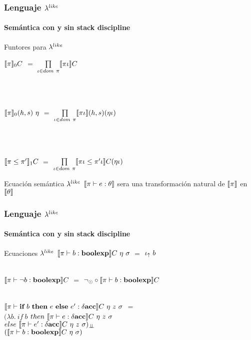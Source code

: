\documentclass{beamer}
\begin{document}
\begin{frame}
\frametitle{Lenguaje $\lambda^{like}$}
\framesubtitle{Semántica con y sin stack discipline}

\begin{block}{Funtores para $\lambda^{like}$}

$\llbracket \pi \rrbracket_0C$ $=$ $\prod\limits_{\iota \in dom \ \pi} \llbracket \pi\iota \rrbracket C$\\

\

\

$\llbracket \pi \rrbracket_0(h,s) \ \eta$ $=$ $\prod\limits_{\iota \in dom \ \pi} 
												\llbracket \pi\iota \rrbracket(h,s)(\eta\iota)$\\
\

\

$\llbracket \pi \leq \pi' \rrbracket_1C$ $=$ $\prod\limits_{\iota \in dom \ \pi} 
												\llbracket \pi\iota \leq \pi'\iota \rrbracket C(\eta\iota)$

\end{block}

\pause

\begin{block}{Ecuación semántica $\lambda^{like}$}
$\llbracket \pi \vdash e : \theta \rrbracket$ sera una transformación natural de $\llbracket \pi \rrbracket$
en $\llbracket \theta \rrbracket$
\end{block}

\end{frame}

\begin{frame}
\frametitle{Lenguaje $\lambda^{like}$}
\framesubtitle{Semántica con y sin stack discipline}

\begin{block}{Ecuaciones $\lambda^{like}$}
$\llbracket  \pi \vdash b : \textbf{boolexp}  \rrbracket C \ \eta \ \sigma$ $=$ $\iota_{\uparrow} \ b$\\

\

$\llbracket  \pi \vdash \neg b : \textbf{boolexp}  \rrbracket C$ 
$=$ 
$\neg_{\odot} \circ \llbracket \pi \vdash b : \textbf{boolexp} \rrbracket C$\\

\

$\llbracket  \pi \vdash \textbf{if} \ b \ \textbf{then} \ e \ \textbf{else} \ e': \delta \textbf{acc} \rrbracket C \ \eta \ z \ \sigma$ 
$=$ \\
\quad \quad \quad 
$(\lambda b . \ if \ b $ $then \ \llbracket  \pi \vdash e : \delta \textbf{acc} \rrbracket C \ \eta \ z \ \sigma$\\
\quad \quad \quad \quad \quad \quad \quad 
$else \ \llbracket  \pi \vdash e' : \delta \textbf{acc} \rrbracket C \ \eta \ z \ \sigma)_{\bot \!\!\! \bot}$ \\
\quad \quad \quad \quad \quad \quad \quad \quad \quad \quad \quad \quad \quad \quad \quad 
$(\llbracket  \pi \vdash b : \textbf{boolexp} \rrbracket C \ \eta \ \sigma)$\\

\end{block}

\end{frame}
\end{document}
